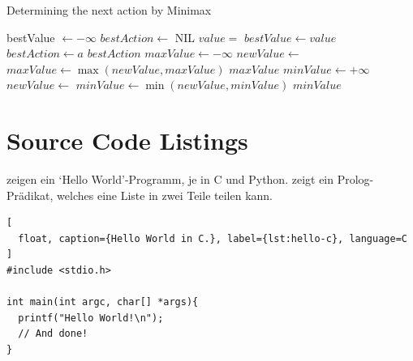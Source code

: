 \begin{algorithm}
  \caption{Determining the next action by Minimax}%
  \label{alg:minimax}
  \begin{algorithmic}[1]
      \State bestValue \(\gets -\infty\)
      \State \(\mathit{bestAction} \gets \) NIL
        \State \(\mathit{value} = \) 
          \label{line:commented}
          \State \(\mathit{bestValue} \gets \mathit{value}\)
          \State \(\mathit{bestAction} \gets a\)
        \EndIf
      \EndFor
      \State \Return \(\mathit{bestAction}\)
    \EndFunction
    \Statex
        \State \Return {}
        \State \(\mathit{maxValue} \gets -\infty \)
          \State \(\mathit{newValue} \gets \) 
          \State \(\mathit{maxValue} \gets
            \max(\mathit{newValue}, \mathit{maxValue})\)
        \EndFor
        \State \Return \(maxValue\)
      \Else
        \State \(minValue \gets +\infty \)
          \State \(\mathit{newValue} \gets \) 
          \State \(\mathit{minValue} \gets
            \min(\mathit{newValue}, \mathit{minValue})\)
        \EndFor
        \State \Return \(minValue\)
      \EndIf
    \EndFunction
  \end{algorithmic}
\end{algorithm}


\section{Source Code Listings}

 zeigen ein `Hello World'-Programm,
je in C und Python.
 zeigt ein Prolog-Prädikat, welches eine Liste in zwei
Teile teilen kann.

\begin{lstlisting}[
  float, caption={Hello World in C.}, label={lst:hello-c}, language=C
]
#include <stdio.h>

int main(int argc, char[] *args){
  printf("Hello World!\n");
  // And done!
}
\end{lstlisting}

